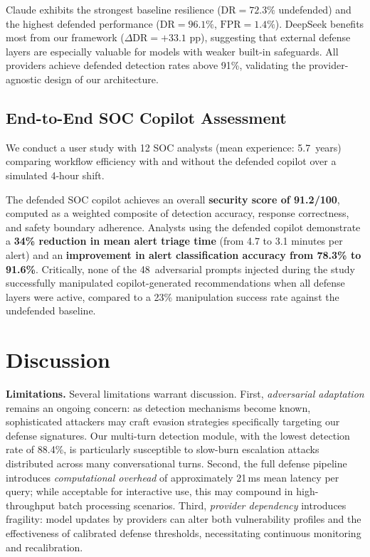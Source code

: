 \documentclass[journal,twoside]{IEEEtran}
\begin{document}
Claude exhibits the strongest baseline resilience ($\text{DR}=72.3\%$ undefended) and the highest defended performance ($\text{DR}=96.1\%$, $\text{FPR}=1.4\%$). DeepSeek benefits most from our framework ($\Delta\text{DR}=+33.1$ pp), suggesting that external defense layers are especially valuable for models with weaker built-in safeguards. All providers achieve defended detection rates above 91\%, validating the provider-agnostic design of our architecture.

\subsection{End-to-End SOC Copilot Assessment}

We conduct a user study with 12 SOC analysts (mean experience: 5.7~years) comparing workflow efficiency with and without the defended copilot over a simulated 4-hour shift.

The defended SOC copilot achieves an overall \textbf{security score of 91.2/100}, computed as a weighted composite of detection accuracy, response correctness, and safety boundary adherence. Analysts using the defended copilot demonstrate a \textbf{34\% reduction in mean alert triage time} (from 4.7 to 3.1 minutes per alert) and an \textbf{improvement in alert classification accuracy from 78.3\% to 91.6\%}. Critically, none of the 48~adversarial prompts injected during the study successfully manipulated copilot-generated recommendations when all defense layers were active, compared to a 23\% manipulation success rate against the undefended baseline.

\section{Discussion}\label{sec:discussion}

\textbf{Limitations.} Several limitations warrant discussion. First, \emph{adversarial adaptation} remains an ongoing concern: as detection mechanisms become known, sophisticated attackers may craft evasion strategies specifically targeting our defense signatures. Our multi-turn detection module, with the lowest detection rate of 88.4\%, is particularly susceptible to slow-burn escalation attacks distributed across many conversational turns. Second, the full defense pipeline introduces \emph{computational overhead} of approximately 21\,ms mean latency per query; while acceptable for interactive use, this may compound in high-throughput batch processing scenarios. Third, \emph{provider dependency} introduces fragility: model updates by providers can alter both vulnerability profiles and the effectiveness of calibrated defense thresholds, necessitating continuous monitoring and recalibration.
\end{document}
